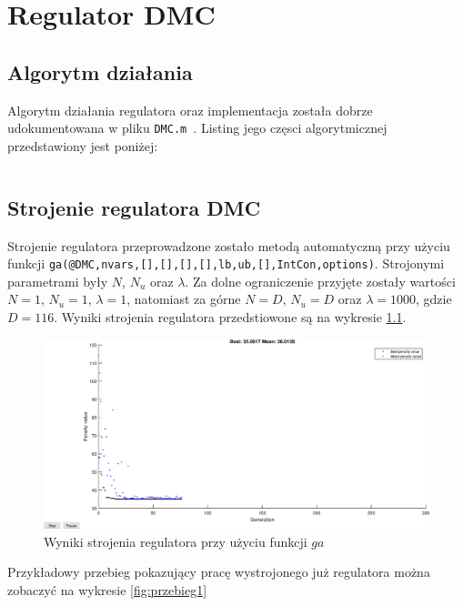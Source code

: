 \chapter{Regulator DMC}
\label{zad5}


\section{Algorytm działania}
Algorytm działania regulatora oraz implementacja została dobrze udokumentowana w pliku \verb+DMC.m +. Listing jego częsci algorytmicznej przedstawiony jest poniżej:
\begin{lstlisting}[style=custommatlab,frame=single,label={zad4_sim_lst},caption={Implementacja regulatora DMC},captionpos=b]

\end{lstlisting}


\section{Strojenie regulatora DMC}


Strojenie regulatora przeprowadzone zostało metodą automatyczną przy użyciu\\ funkcji \verb+ga(@DMC,nvars,[],[],[],[],lb,ub,[],IntCon,options)+. Strojonymi parametrami były $N$, $N_u$ oraz $\lambda$. Za dolne ograniczenie przyjęte zostały wartości $N=1$, $N_u = 1$, $\lambda = 1$, natomiast za górne $N=D$, $N_u = D$ oraz $\lambda = 1000$, gdzie $D = 116$. Wyniki strojenia regulatora przedstiowone są na wykresie \ref{fig:strojenie}.

\begin{figure}[h!]
	\centering
	\includegraphics[scale=0.5]{Rys/strojenie.eps}
	\caption{Wyniki strojenia regulatora przy użyciu funkcji $ga$}
	\label{fig:strojenie}
\end{figure}

Przykładowy przebieg pokazujący pracę wystrojonego już regulatora można zobaczyć na wykresie \ref{fig:przebieg1}

